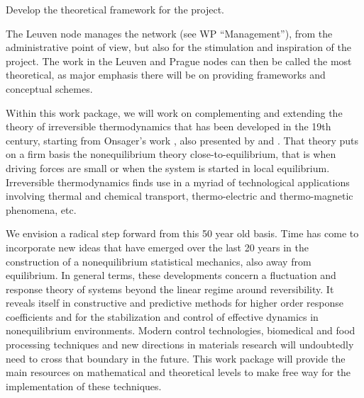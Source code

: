 \begin{workpackage}[id=WPcore,wphases=0-48,
  short=Gen. Theory, %
  title=General Theory, %
  lead=KUL,
  KULRM=36,UNIPDRM=6]

\newrefsection

\begin{wpobjectives}
\begin{compactitem}
\item Develop the theoretical framework for the project.
\end{compactitem}
\end{wpobjectives}

\begin{wpdescription}

The Leuven node manages the network (see WP ``Management''), from the administrative point
of view, but also for the stimulation and inspiration of the project. The work in the Leuven
and Prague nodes can then be called the most theoretical, as major emphasis there will be on
providing frameworks and conceptual schemes.

Within this work package, we will work on complementing and extending the theory of
irreversible thermodynamics that has been developed in the 19th century, starting from
Onsager's work \cite{onsager1,onsager2}, also presented by \cite{degrootmazur} and \cite{kubo}.
%
That theory puts on a firm basis the nonequilibrium theory close-to-equilibrium, that is
when driving forces are small or when the system is started in local equilibrium.
%
Irreversible thermodynamics finds use in a myriad of technological applications involving
thermal and chemical transport, thermo-electric and thermo-magnetic phenomena, etc.

We envision a radical step forward from this 50 year old basis. Time has come to incorporate
new ideas that have emerged over the last 20 years in the construction of a nonequilibrium
statistical mechanics, also away from equilibrium.
%
In general terms, these developments concern a fluctuation and response theory of systems
beyond the linear regime around reversibility. It reveals itself in constructive and
predictive methods for higher order response coefficients and for the stabilization and
control of effective dynamics in nonequilibrium environments.
%
Modern control technologies, biomedical and food processing techniques and new directions in
materials research will undoubtedly need to cross that boundary in the future. This
work package will provide the main resources on mathematical and theoretical levels to make
free way for the implementation of these techniques.


\end{wpdescription}
\end{workpackage}
